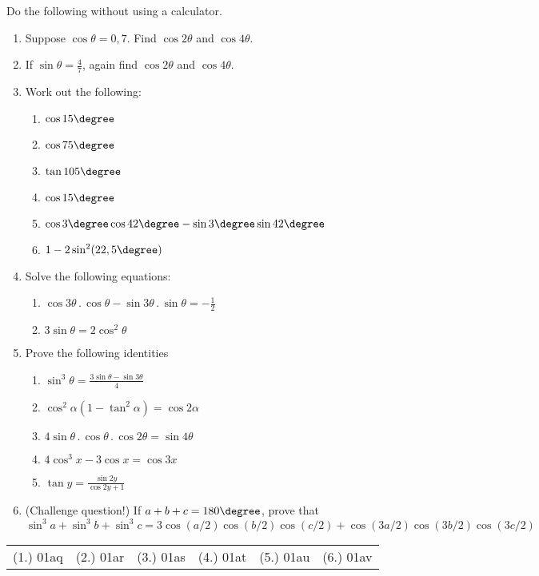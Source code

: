 \begin{eocexercises}{}
Do the following without using a calculator.
\begin{enumerate}
\item Suppose $\cos\theta=0,7$. Find $\cos 2\theta$ and $\cos 4\theta$.
\item If $\sin\theta=\frac{4}{7}$, again find $\cos 2\theta$ and $\cos 4\theta$.
\item Work out the following:
\begin{enumerate}
\item $\cos 15\degree$
\item $\cos 75\degree$
\item $\tan 105\degree$
\item $\cos 15\degree$
\item $\cos 3\degree \cos 42\degree -\sin 3\degree \sin 42\degree$
\item $1-2 \sin^2 (22,5\degree)$
\end{enumerate}
\item Solve the following equations:
\begin{enumerate}
\item $\cos 3\theta\,.\,\cos\theta-\sin 3\theta\,.\,\sin\theta=-\frac{1}{2}$
\item $3\sin \theta=2\cos^2\theta$

\end{enumerate}
\item Prove the following identities
\begin{enumerate}
\item $\sin^3\theta=\frac{3\sin\theta-\sin 3\theta}{4}$
\item $\cos^2\alpha (1-\tan^2\alpha)=\cos 2\alpha$
\item $4\sin\theta\,.\,\cos\theta\,.\,\cos 2\theta= \sin 4\theta$
\item $4\cos^3 x -3\cos x=\cos 3x$
\item $\tan y=\frac{\sin 2y}{\cos 2y+1}$
\end{enumerate}
\item (Challenge question!) If $a+b+c=180\degree$, prove that 
$$\sin^3 a+\sin^3 b+ \sin^3 c = 3\cos(a/2)\cos(b/2)\cos(c/2)+ \cos(3a/2)\cos(3b/2)\cos(3c/2)$$

\end{enumerate}









\par \practiceinfo
\par \begin{tabular}[h]{cccccc}
(1.)	01aq	&
(2.)	01ar	&
(3.)	01as	&
(4.)	01at	&
(5.)	01au	&
(6.)	01av	\\ %
\end{tabular}
\end{eocexercises}
